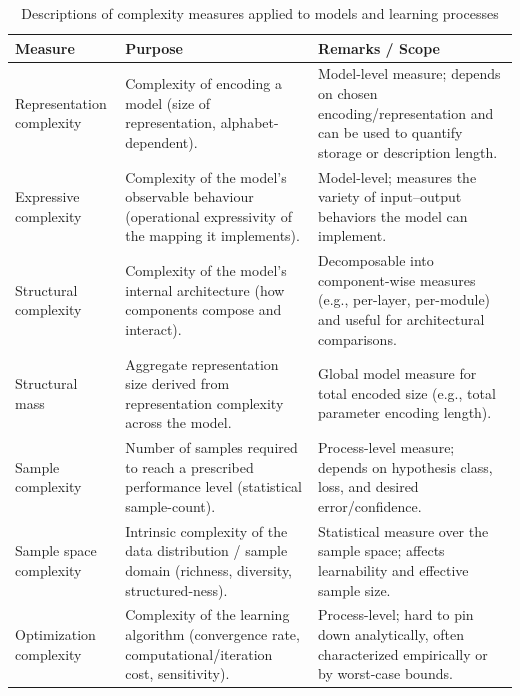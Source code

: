 \begin{table}[htbp]
  \centering
  \footnotesize
  \begin{threeparttable}
    \caption{Descriptions of complexity measures applied to models and learning processes}
    \label{tab:complexity-measures}
    \begin{tabularx}{\textwidth}{@{} >{\RaggedRight\arraybackslash}X
                                     >{\RaggedRight\arraybackslash}X
                                     >{\RaggedRight\arraybackslash}X @{}}
      \toprule
      \textbf{Measure} & \textbf{Purpose} & \textbf{Remarks / Scope} \\
      \midrule
      Representation complexity
        & Complexity of encoding a model (size of representation, alphabet-dependent).
        & Model-level measure; depends on chosen encoding/representation and can be used to quantify storage or description length. \\
      \addlinespace[2pt]
      Expressive complexity
        & Complexity of the model's observable behaviour (operational expressivity of the mapping it implements).
        & Model-level; measures the variety of input–output behaviors the model can implement. \\
      \addlinespace[2pt]
      Structural complexity
        & Complexity of the model's internal architecture (how components compose and interact).
        & Decomposable into component-wise measures (e.g., per-layer, per-module) and useful for architectural comparisons. \\
      \addlinespace[2pt]
      Structural mass
        & Aggregate representation size derived from representation complexity across the model.
        & Global model measure for total encoded size (e.g., total parameter encoding length). \\
      \addlinespace[2pt]
      Sample complexity
        & Number of samples required to reach a prescribed performance level (statistical sample-count).
        & Process-level measure; depends on hypothesis class, loss, and desired error/confidence. \\
      \addlinespace[2pt]
      Sample space complexity
        & Intrinsic complexity of the data distribution / sample domain (richness, diversity, structured-ness).
        & Statistical measure over the sample space; affects learnability and effective sample size. \\
      \addlinespace[2pt]
      Optimization complexity
        & Complexity of the learning algorithm (convergence rate, computational/iteration cost, sensitivity).
        & Process-level; hard to pin down analytically, often characterized empirically or by worst-case bounds. \\
      \bottomrule
    \end{tabularx}


\end{threeparttable}
\end{table}
